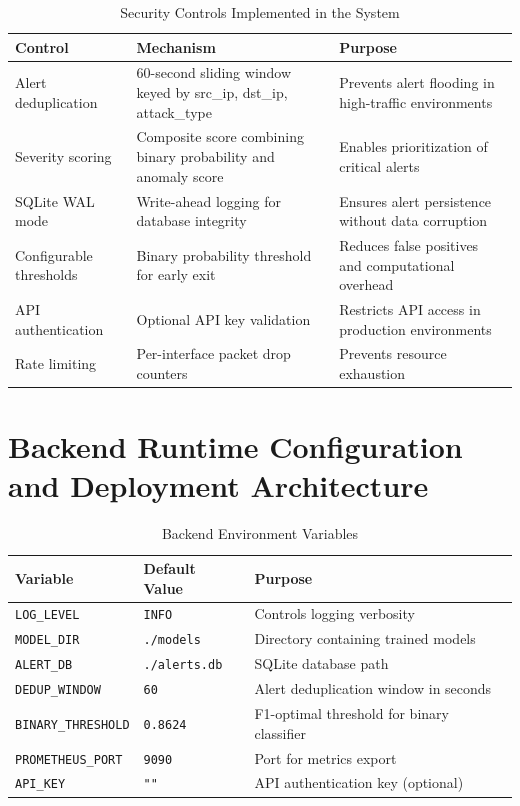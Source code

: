 \documentclass[12pt,a4paper]{report}
\begin{document}
\begin{table}[htbp]
\centering
\caption{Security Controls Implemented in the System}
\label{tab:security_controls}
\renewcommand{\arraystretch}{1.5}

\begin{tabularx}{\textwidth}{|p{3.0cm}|p{5.0cm}|X|}
\hline
\textbf{Control} & \textbf{Mechanism} & \textbf{Purpose} \\
\hline
Alert deduplication & 60-second sliding window keyed by src\_ip, dst\_ip, attack\_type & Prevents alert flooding in high-traffic environments \\
\hline
Severity scoring & Composite score combining binary probability and anomaly score & Enables prioritization of critical alerts \\
\hline
SQLite WAL mode & Write-ahead logging for database integrity & Ensures alert persistence without data corruption \\
\hline
Configurable thresholds & Binary probability threshold for early exit & Reduces false positives and computational overhead \\
\hline
API authentication & Optional API key validation & Restricts API access in production environments \\
\hline
Rate limiting & Per-interface packet drop counters & Prevents resource exhaustion \\
\hline
\end{tabularx}
\end{table}

\section{Backend Runtime Configuration and Deployment Architecture}

\begin{table}[htbp]
\centering
\caption{Backend Environment Variables}
\label{tab:backend_environment_variables}
\renewcommand{\arraystretch}{1.5}

\begin{tabularx}{\textwidth}{|p{3.8cm}|p{3.0cm}|X|}
\hline
\textbf{Variable} & \textbf{Default Value} & \textbf{Purpose} \\
\hline
\texttt{LOG\_LEVEL} & \texttt{INFO} & Controls logging verbosity \\
\hline
\texttt{MODEL\_DIR} & \texttt{./models} & Directory containing trained models \\
\hline
\texttt{ALERT\_DB} & \texttt{./alerts.db} & SQLite database path \\
\hline
\texttt{DEDUP\_WINDOW} & \texttt{60} & Alert deduplication window in seconds \\
\hline
\texttt{BINARY\_THRESHOLD} & \texttt{0.8624} & F1-optimal threshold for binary classifier \\
\hline
\texttt{PROMETHEUS\_PORT} & \texttt{9090} & Port for metrics export \\
\hline
\texttt{API\_KEY} & \texttt{""} & API authentication key (optional) \\
\hline
\end{tabularx}
\end{table}
\end{document}
